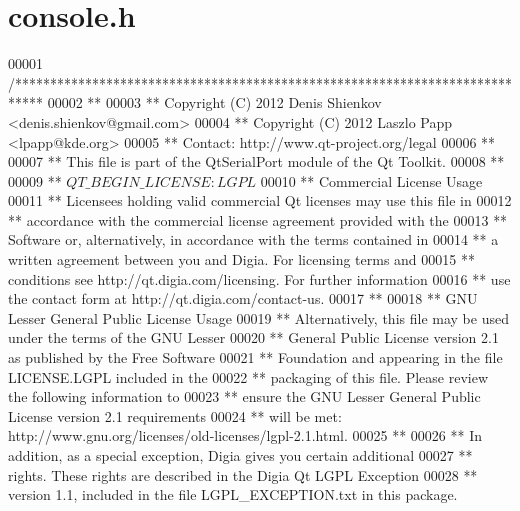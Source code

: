 \hypertarget{a00088_source}{\section{console.\+h}
\label{a00088_source}
}

\begin{DoxyCode}
00001 \textcolor{comment}{/****************************************************************************}
00002 \textcolor{comment}{**}
00003 \textcolor{comment}{** Copyright (C) 2012 Denis Shienkov <denis.shienkov@gmail.com>}
00004 \textcolor{comment}{** Copyright (C) 2012 Laszlo Papp <lpapp@kde.org>}
00005 \textcolor{comment}{** Contact: http://www.qt-project.org/legal}
00006 \textcolor{comment}{**}
00007 \textcolor{comment}{** This file is part of the QtSerialPort module of the Qt Toolkit.}
00008 \textcolor{comment}{**}
00009 \textcolor{comment}{** $QT\_BEGIN\_LICENSE:LGPL$}
00010 \textcolor{comment}{** Commercial License Usage}
00011 \textcolor{comment}{** Licensees holding valid commercial Qt licenses may use this file in}
00012 \textcolor{comment}{** accordance with the commercial license agreement provided with the}
00013 \textcolor{comment}{** Software or, alternatively, in accordance with the terms contained in}
00014 \textcolor{comment}{** a written agreement between you and Digia.  For licensing terms and}
00015 \textcolor{comment}{** conditions see http://qt.digia.com/licensing.  For further information}
00016 \textcolor{comment}{** use the contact form at http://qt.digia.com/contact-us.}
00017 \textcolor{comment}{**}
00018 \textcolor{comment}{** GNU Lesser General Public License Usage}
00019 \textcolor{comment}{** Alternatively, this file may be used under the terms of the GNU Lesser}
00020 \textcolor{comment}{** General Public License version 2.1 as published by the Free Software}
00021 \textcolor{comment}{** Foundation and appearing in the file LICENSE.LGPL included in the}
00022 \textcolor{comment}{** packaging of this file.  Please review the following information to}
00023 \textcolor{comment}{** ensure the GNU Lesser General Public License version 2.1 requirements}
00024 \textcolor{comment}{** will be met: http://www.gnu.org/licenses/old-licenses/lgpl-2.1.html.}
00025 \textcolor{comment}{**}
00026 \textcolor{comment}{** In addition, as a special exception, Digia gives you certain additional}
00027 \textcolor{comment}{** rights.  These rights are described in the Digia Qt LGPL Exception}
00028 \textcolor{comment}{** version 1.1, included in the file LGPL\_EXCEPTION.txt in this package.}

\end{DoxyCode}
